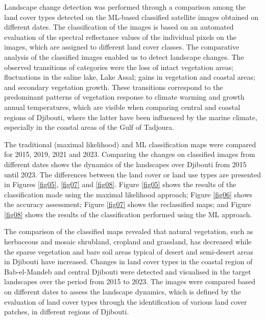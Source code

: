 \documentclass[jimaging,article,accept,pdftex,moreauthors]{Definitions/mdpi}
\begin{document}
Landscape change detection{ was performed }through a comparison among the land cover types detected on the ML-based classified satellite images obtained on different dates. {The} classification of the images is based on an automated evaluation of the spectral reflectance values of the individual pixels on the images, which are assigned to different land cover classes. {The} comparative analysis of {the} classified images {enabled us} to detect landscape changes. {The {observed} transitions {of categories} were the loss of intact vegetation areas; fluctuations in the saline lake, Lake Assal{;} gains in vegetation {and} coastal areas; {and} secondary vegetation growth.} %
These transitions correspond to the predominant patterns of vegetation response to climate warming and growth annual temperatures, which are visible when comparing central and coastal regions of Djibouti, {where the latter have been influenced by the marine climate,} %
especially in the coastal areas of the Gulf of Tadjoura.

{The} traditional (maximal likelihood) and ML{ }classification maps {were} compared {for} 2015, 2019, 2021 and 2023. Comparing the changes on classified images from different dates shows the dynamics of the landscapes over Djibouti from 2015 until 2023. The{ }differences between the{ }land cover or land use types are presented in Figures \ref{fig05}, \ref{fig07} and \ref{fig08}. Figure \ref{fig05} shows the results of the classification made using the maximal likelihood approach; Figure \ref{fig06} shows the accuracy assessment; Figure \ref{fig07} shows the reclassified maps; and Figure \ref{fig08} shows the results of the classification performed using the ML approach. 



The comparison of the classified maps revealed that{ }natural vegetation, such as herbaceous{ }and mosaic shrubland, cropland and grassland, has decreased while the sparse vegetation and bare soil areas typical of desert and semi-desert areas in Djibouti have increased. {Changes} in land cover types in the coastal region of Bab-el-Mandeb and central Djibouti were detected and visualised in the target landscapes over the period from 2015 to 2023. {The} images were compared based on different dates to assess the landscape dynamics, which is defined by the evaluation of land cover types through the identification of various land cover patches, in different regions of Djibouti.
\end{document}
